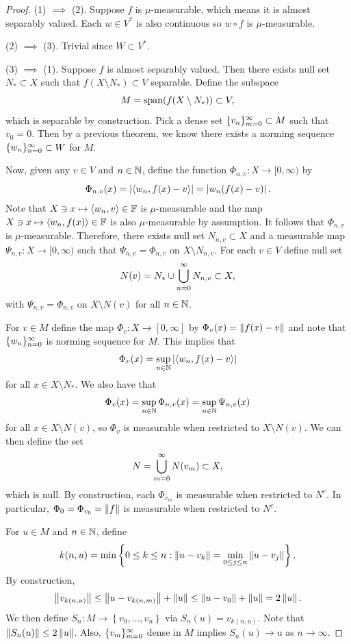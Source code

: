 \documentclass[a4paper]{article}
\begin{document}
\begin{proof}
  (1) $\implies$ (2). Suppose $f$ is $\mu$-measurable, 
  which means it is almost separably valued.
  Each $w \in V^*$ is also continuous so 
  $w \circ f$ is $\mu$-measurable.

  (2) $\implies$ (3). Trivial since $W \subset V^*$.
  
  (3) $\implies$ (1). Suppose $f$ is almost separably valued.
  Then there exists null set $N_* \subset X$ such that 
  $f(X \setminus N_*) \subset V$ separable. Define the subspace 
  \[
  M = \operatorname{span}(f(X \setminus N_*)) \subset V,
  \] 
  which is separable by construction. Pick a dense 
  set $\{ v_n \}_{m=0}^\infty \subset M$ such that $v_0 = 0$. 
  Then by a previous theorem, we know there exists
  a norming sequence $\{ w_n \}_{n=0}^\infty \subset W$ for $M$.
  
  Now, given any $v \in V$ and $n \in \mathbb{N}$, define 
  the function $\Phi_{n, v} : X \to [0, \infty)$ 
  by 
  \[
  \Phi_{n, v}(x) = \left\lvert \left\langle w_n, f(x) - v \right\rangle\right\rvert
  = \left\lvert w_n(f(x) - v)\right\rvert.
  \]
  Note that $X \ni x \mapsto \left\langle w_n, v \right\rangle \in \mathbb{F}$ is 
  $\mu$-measurable and the map $X \ni x \mapsto 
  \left\langle w_n, f(x) \right\rangle \in \mathbb{F}$ is also $\mu$-measurable
  by assumption. It follows that 
  $\Phi_{n, v}$ is $\mu$-measurable. Therefore, 
  there exists null set $N_{n, v} \subset X$ and 
  a measurable map $\Psi_{n, v} : X \to [0, \infty)$
  such that $\Psi_{n, v} = \Phi_{n, v}$ on $X \setminus 
  N_{n, v}$. For each $v \in V$ define null set 
  \[
  N(v) = N_* \cup \bigcup_{n=0}^\infty N_{n, v} \subset X,
  \]
  with $\Psi_{n, v} = \Phi_{n, v}$ on $X \setminus N(v)$
  for all $n \in \mathbb{N}$. 

  For $v \in M$ define the map $\Phi_v : X \to [0, \infty]$
  by $\Phi_v(x) = \left\lVert f(x) - v\right\rVert$ and note that 
  $\{ w_n \}_{n=0}^\infty$ is norming sequence for $M$. 
  This implies that 
  \[
  \Phi_v(x) = \sup_{n \in \mathbb{N}} \left\lvert \left\langle w_n, f(x) - v \right\rangle\right\rvert
  \]
  for all $x \in X \setminus N_*$. We also have that 
  \[
  \Phi_v(x) = \sup_{n \in \mathbb{N}} \Phi_{n, v}(x) 
  = \sup_{n \in \mathbb{N}} \Psi_{n, v}(x)
  \]
  for all $x \in X \setminus N(v)$, so $\Phi_v$ 
  is measurable when restricted to $X \setminus N(v)$.
  We can then define the set 
  \[
  N = \bigcup_{m=0}^\infty N(v_m) \subset X, 
  \]
  which is null. By construction, each $\Phi_{v_m}$
  is measurable when restricted to $N^c$. 
  In particular, $\Phi_0 = \Phi_{v_0} = \left\lVert f\right\rVert$ 
  is measurable when restricted to $N^c$.

  For $u \in M$ and $n \in \mathbb{N}$, define 
  \[
  k(n, u) = \min \left\{ 0 \leq k \leq n :
  \left\lVert u - v_k\right\rVert = \min_{0 \leq j \leq n} 
  \left\lVert u - v_j\right\rVert \right\}.
  \]
  By construction, 
  \[
  \left\lVert v_{k(n, u)}\right\rVert 
  \leq \left\lVert u - v_{k(n, m)}\right\rVert + \left\lVert u\right\rVert
  \leq \left\lVert u - v_0\right\rVert + \left\lVert u\right\rVert 
  = 2\left\lVert u\right\rVert.
  \]
  We then define $S_n: M \to \left\{ v_0, \dots, v_n
  \right\}$ via $S_n(u) = v_{k(n, u)}$. Note that 
  $\left\lVert S_n(u)\right\rVert \leq 2 \left\lVert u\right\rVert$. Also, 
  $\{ v_m \}_{m=0}^\infty$ dense in $M$ implies
  $S_n(u) \to u$ as $n \to \infty$. 


\end{proof}
\end{document}
